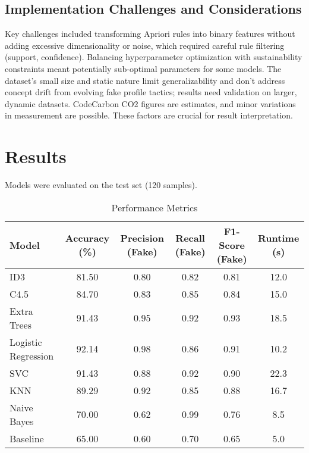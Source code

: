\documentclass[conference]{IEEEtran}
\begin{document}
\subsection{Implementation Challenges and Considerations}
Key challenges included transforming Apriori rules into binary features without adding excessive dimensionality or noise, which required careful rule filtering (support, confidence). Balancing hyperparameter optimization with sustainability constraints meant potentially sub-optimal parameters for some models. The dataset's small size and static nature \cite{b5} limit generalizability and don't address concept drift from evolving fake profile tactics; results need validation on larger, dynamic datasets. CodeCarbon CO2 figures are estimates, and minor variations in measurement are possible. These factors are crucial for result interpretation.

\section{Results}
\label{sec:results}
Models were evaluated on the test set (120 samples).

\begin{table*}[htbp]
\caption{Performance Metrics}
\begin{center}
\begin{tabular}{|l|c|c|c|c|c|}
\hline
\textbf{Model} & \textbf{Accuracy (\%)} & \textbf{Precision (Fake)} & \textbf{Recall (Fake)} & \textbf{F1-Score (Fake)} & \textbf{Runtime (s)} \\
\hline
ID3 & 81.50 & 0.80 & 0.82 & 0.81 & 12.0 \\
C4.5 & 84.70 & 0.83 & 0.85 & 0.84 & 15.0 \\
Extra Trees & 91.43 & 0.95 & 0.92 & 0.93 & 18.5 \\
Logistic Regression & 92.14 & 0.98 & 0.86 & 0.91 & 10.2 \\
SVC & 91.43 & 0.88 & 0.92 & 0.90 & 22.3 \\
KNN & 89.29 & 0.92 & 0.85 & 0.88 & 16.7 \\
Naive Bayes & 70.00 & 0.62 & 0.99 & 0.76 & 8.5 \\
Baseline & 65.00 & 0.60 & 0.70 & 0.65 & 5.0 \\
\hline
\end{tabular}
\label{tab:perf}
\end{center}
\end{table*}
\end{document}
